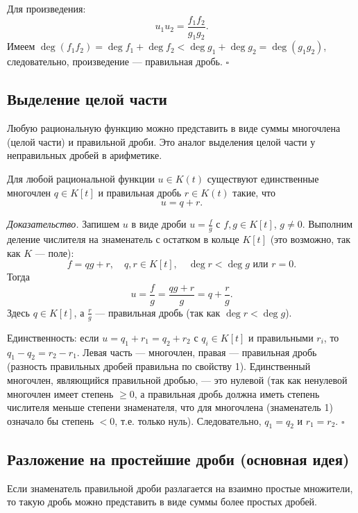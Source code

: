 \documentclass[a4paper,12pt]{article}
\theoremstyle{definition}
\theoremstyle{plain}
\theoremstyle{remark}
\begin{document}
	Для произведения:
	\[
	u_1 u_2 = \frac{f_1 f_2}{g_1 g_2}.
	\]
	Имеем \( \deg(f_1 f_2) = \deg f_1 + \deg f_2 < \deg g_1 + \deg g_2 = \deg(g_1 g_2) \), следовательно, произведение — правильная дробь. \hfill \(\square\)
	
	\subsection{Выделение целой части}
	
	Любую рациональную функцию можно представить в виде суммы многочлена (целой части) и правильной дроби. Это аналог выделения целой части у неправильных дробей в арифметике.
	
	\begin{tcolorbox}[colback=yellow!5, colframe=orange!50!black, title=Свойство 2 (Выделение целой части)]
		Для любой рациональной функции \( u \in K(t) \) существуют единственные многочлен \( q \in K[t] \) и правильная дробь \( r \in K(t) \) такие, что
		\[
		u = q + r.
		\]
	\end{tcolorbox}
	
	\medskip
	\textit{Доказательство.}
	Запишем \( u \) в виде дроби \( u = \frac{f}{g} \) с \( f, g \in K[t] \), \( g \neq 0 \). Выполним деление числителя на знаменатель с остатком в кольце \( K[t] \) (это возможно, так как \( K \) — поле):
	\[
	f = q g + r, \quad q, r \in K[t], \quad \deg r < \deg g \text{ или } r = 0.
	\]
	Тогда
	\[
	u = \frac{f}{g} = \frac{q g + r}{g} = q + \frac{r}{g}.
	\]
	Здесь \( q \in K[t] \), а \( \frac{r}{g} \) — правильная дробь (так как \( \deg r < \deg g \)).
	
	Единственность: если \( u = q_1 + r_1 = q_2 + r_2 \) с \( q_i \in K[t] \) и правильными \( r_i \), то \( q_1 - q_2 = r_2 - r_1 \). Левая часть — многочлен, правая — правильная дробь (разность правильных дробей правильна по свойству 1). Единственный многочлен, являющийся правильной дробью, — это нулевой (так как ненулевой многочлен имеет степень \( \geq 0 \), а правильная дробь должна иметь степень числителя меньше степени знаменателя, что для многочлена (знаменатель 1) означало бы степень \( < 0 \), т.е. только нуль). Следовательно, \( q_1 = q_2 \) и \( r_1 = r_2 \). \hfill \(\square\)
	
	\subsection{Разложение на простейшие дроби (основная идея)}
	
	Если знаменатель правильной дроби разлагается на взаимно простые множители, то такую дробь можно представить в виде суммы более простых дробей.
	
\end{document}
